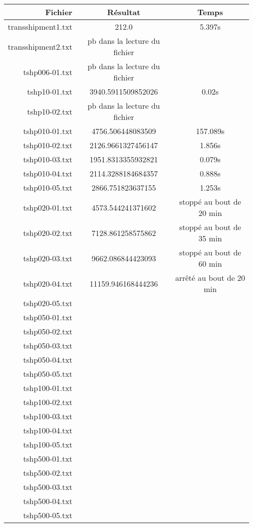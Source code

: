 \documentclass[a4paper,12pt]{article}
\begin{document}
\begin{center}
 \begin{tabular}{r | c | c}
\textbf{Fichier} & \textbf{R\'esultat} & \textbf{Temps} \\ \hline
transshipment1.txt & 212.0 & 5.397s \\
transshipment2.txt & pb dans la lecture du fichier & \\
tshp006-01.txt & pb dans la lecture du fichier & \\
tshp10-01.txt & 3940.5911509852026 & 0.02s \\
tshp10-02.txt & pb dans la lecture du fichier & \\
tshp010-01.txt & 4756.506448083509 & 157.089s \\
tshp010-02.txt & 2126.9661327456147 & 1.856s \\
tshp010-03.txt & 1951.8313355932821 & 0.079s \\
tshp010-04.txt & 2114.3288184684357 & 0.888s \\
tshp010-05.txt & 2866.751823637155 & 1.253s \\
tshp020-01.txt & 4573.544241371602 & stopp\'e au bout de 20 min \\
tshp020-02.txt & 7128.861258575862 & stopp\'e au bout de 35 min \\
tshp020-03.txt & 9662.086844423093 & stopp\'e au bout de 60 min \\
tshp020-04.txt & 11159.946168444236 & arrêté au bout de 20 min \\
tshp020-05.txt & & \\
tshp050-01.txt & & \\
tshp050-02.txt & & \\
tshp050-03.txt & & \\
tshp050-04.txt & & \\
tshp050-05.txt & & \\
tshp100-01.txt & & \\
tshp100-02.txt & & \\
tshp100-03.txt & & \\
tshp100-04.txt & & \\
tshp100-05.txt & & \\
tshp500-01.txt & & \\
tshp500-02.txt & & \\
tshp500-03.txt & & \\
tshp500-04.txt & & \\
tshp500-05.txt & & \\
  
 \end{tabular}

\end{center}
\end{document}
